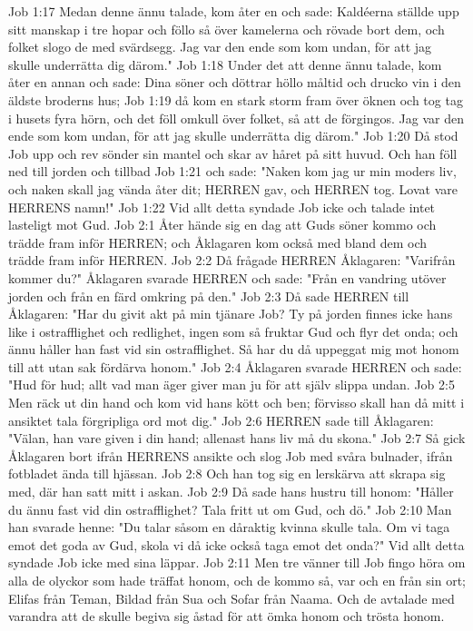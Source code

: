 Job 1:17  Medan denne ännu talade, kom åter en och sade: Kaldéerna ställde upp sitt manskap i tre hopar och föllo så över kamelerna och rövade bort dem, och folket slogo de med svärdsegg. Jag var den ende som kom undan, för att jag skulle underrätta dig därom."
Job 1:18  Under det att denne ännu talade, kom åter en annan och sade: Dina söner och döttrar höllo måltid och drucko vin i den äldste broderns hus;
Job 1:19  då kom en stark storm fram över öknen och tog tag i husets fyra hörn, och det föll omkull över folket, så att de förgingos. Jag var den ende som kom undan, för att jag skulle underrätta dig därom."
Job 1:20  Då stod Job upp och rev sönder sin mantel och skar av håret på sitt huvud. Och han föll ned till jorden och tillbad
Job 1:21  och sade: "Naken kom jag ur min moders liv, och naken skall jag vända åter dit; HERREN gav, och HERREN tog. Lovat vare HERRENS namn!"
Job 1:22  Vid allt detta syndade Job icke och talade intet lasteligt mot Gud.
Job 2:1  Åter hände sig en dag att Guds söner kommo och trädde fram inför HERREN; och Åklagaren kom också med bland dem och trädde fram inför HERREN.
Job 2:2  Då frågade HERREN Åklagaren: "Varifrån kommer du?" Åklagaren svarade HERREN och sade: "Från en vandring utöver jorden och från en färd omkring på den."
Job 2:3  Då sade HERREN till Åklagaren: "Har du givit akt på min tjänare Job? Ty på jorden finnes icke hans like i ostrafflighet och redlighet, ingen som så fruktar Gud och flyr det onda; och ännu håller han fast vid sin ostrafflighet. Så har du då uppeggat mig mot honom till att utan sak fördärva honom."
Job 2:4  Åklagaren svarade HERREN och sade: "Hud för hud; allt vad man äger giver man ju för att själv slippa undan.
Job 2:5  Men räck ut din hand och kom vid hans kött och ben; förvisso skall han då mitt i ansiktet tala förgripliga ord mot dig."
Job 2:6  HERREN sade till Åklagaren: "Välan, han vare given i din hand; allenast hans liv må du skona."
Job 2:7  Så gick Åklagaren bort ifrån HERRENS ansikte och slog Job med svåra bulnader, ifrån fotbladet ända till hjässan.
Job 2:8  Och han tog sig en lerskärva att skrapa sig med, där han satt mitt i askan.
Job 2:9  Då sade hans hustru till honom: "Håller du ännu fast vid din ostrafflighet? Tala fritt ut om Gud, och dö."
Job 2:10  Man han svarade henne: "Du talar såsom en dåraktig kvinna skulle tala. Om vi taga emot det goda av Gud, skola vi då icke också taga emot det onda?" Vid allt detta syndade Job icke med sina läppar.
Job 2:11  Men tre vänner till Job fingo höra om alla de olyckor som hade träffat honom, och de kommo så, var och en från sin ort; Elifas från Teman, Bildad från Sua och Sofar från Naama. Och de avtalade med varandra att de skulle begiva sig åstad för att ömka honom och trösta honom.
